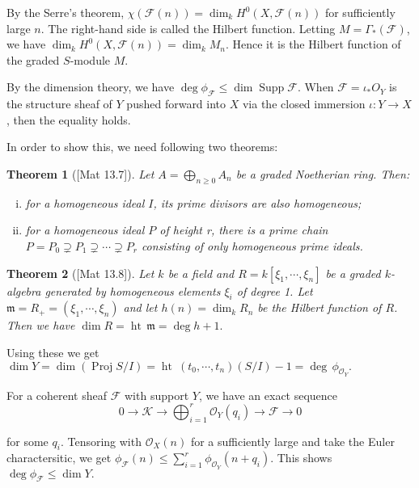 \documentclass{article}
\theoremstyle{theorem}
\newtheorem{theorem}{Theorem}[section]
\begin{document}
    By the Serre's theorem, $\chi(\mathcal F(n)) = \dim_k H^0(X, \mathcal F(n))$ for sufficiently large $n.$ The right-hand side is called the Hilbert function. Letting $M = \Gamma_*(\mathcal F)$, we have $\dim_k H^0(X, \mathcal F(n)) = \dim_k M_n$. Hence it is the Hilbert function of the graded $S$-module $M$.
    
    By the dimension theory, we have $\deg \phi_{\mathcal F} \leq \dim \operatorname {Supp} \mathcal F.$ When $\mathcal F = \mathcal \iota_*O_Y$ is the structure sheaf of $Y$ pushed forward into $X$ via the closed immersion $\iota: Y \rightarrow X$,  then the equality holds.
    
    In order to show this, we need following two theorems:
    
    \begin{theorem} [{[}Mat 13.7{]}] \label{graded_ring_prime}
        Let $\displaystyle A = \bigoplus_{n \geq 0} A_n$ be a graded Noetherian ring. Then:
        \begin{enumerate}[(i)]
            \item for a homogeneous ideal $I$, its prime divisors are also homogeneous;
            \item for a homogeneous ideal $P$ of height r, there is a prime chain $P = P_0 \supsetneq P_1 \supsetneq \cdots \supsetneq P_r$ consisting of only homogeneous prime ideals.
        \end{enumerate}
    \end{theorem}
    
    
    \begin{theorem} [{[}Mat 13.8{]}] \label{graded_ring_dimension}
        Let $k$ be a field and $\displaystyle R = k[\xi_1, \cdots, \xi_n]$ be a graded $k$-algebra generated by homogeneous elements $\xi_i$ of degree 1. Let $\mathfrak m = R_+ = (\xi_1, \cdots, \xi_n)$ and let $h(n) = \dim_k R_n$ be the Hilbert function of $R$. Then we have $\dim R = \operatorname{ht} \, \mathfrak m = \deg h + 1.$
    \end{theorem}
    
    Using these we get $\dim Y = \dim (\operatorname{Proj} S/I) = \operatorname{ht} \ (t_0, \cdots, t_n) (S/I) - 1 = \deg \, \phi_{\mathcal O_Y}.$
    
    For a coherent sheaf $\mathcal F$ with support $Y$, we have an exact sequence 
    $$\displaystyle 0 \rightarrow \mathcal K \rightarrow \bigoplus_{i = 1}^{r} \mathcal O_Y(q_i) \rightarrow \mathcal F \rightarrow 0 $$
    
    for some $q_i$. Tensoring with $\mathcal O_X(n)$ for a sufficiently large and take the Euler charactersitic, we get $\displaystyle \phi_{\mathcal F}(n) \leq \sum_{i=1}^{r} \phi_{\mathcal O_Y}(n + q_i).$ This shows $\deg \phi_{\mathcal F} \leq \dim Y.$
    
\end{document}
